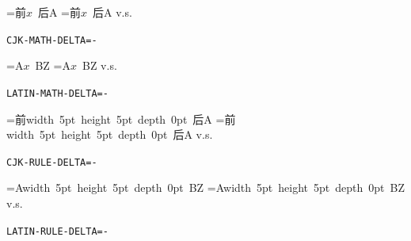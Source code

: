 \documentclass{article}
\newcommand\auditrule{\vrule width 5pt height 5pt depth 0pt\relax}
\begin{document}
=\hbox{前$x$ 后A}
=\hbox{前\mbox{$x$} 后A}
 v.s. 

\texttt{CJK-MATH-DELTA=\the\dimexpr{}-\relax}

\bigskip
{}=\hbox{A$x$ BZ}
=\hbox{A\mbox{$x$} BZ}
 v.s. 

\texttt{LATIN-MATH-DELTA=\the\dimexpr{}-\relax}

\bigskip
{}=\hbox{前{\auditrule} 后A}
=\hbox{前\mbox{\auditrule} 后A}
 v.s. 

\texttt{CJK-RULE-DELTA=\the\dimexpr{}-\relax}

\bigskip
{}=\hbox{A{\auditrule} BZ}
=\hbox{A\mbox{\auditrule} BZ}
 v.s. 

\texttt{LATIN-RULE-DELTA=\the\dimexpr{}-\relax}
\end{document}
